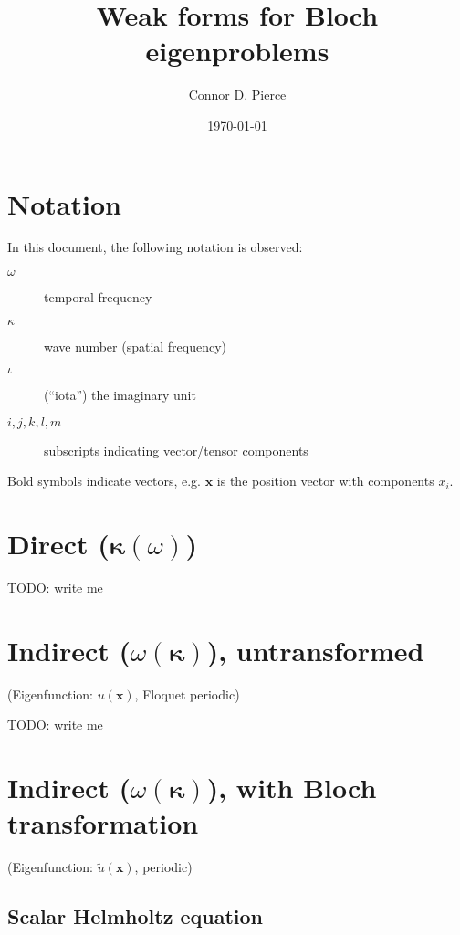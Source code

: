 \documentclass{article}
\title{Weak forms for Bloch eigenproblems}
\author{Connor D. Pierce}
\date{\today}
\newcommand{\imag}{\iota}
\newcommand{\vect}[1]{\boldsymbol{#1}}
\newcommand{\x}{x}
\newcommand{\vecx}{\vect{\x}}
\newcommand{\wavenum}{\kappa}
\newcommand{\wavevec}{\vect{\wavenum}}
\newcommand{\kernel}[1]{\tilde{#1}}
\begin{document}
\maketitle


\section{Notation}

In this document, the following notation is observed:

\begin{description}
    \item[$\omega$] temporal frequency
    \item[$\wavenum$] wave number (spatial frequency)
    \item[$\imag$] (``iota'') the imaginary unit
    \item[$i,j,k,l,m$] subscripts indicating vector/tensor components
\end{description}

Bold symbols indicate vectors, e.g. \(\vecx\) is the position vector with components \(\x_{i}\).


\section{Direct ($\wavevec(\omega)$)}
TODO: write me


\section{Indirect ($\omega(\wavevec)$), untransformed}
(Eigenfunction: $u(\vecx)$, Floquet periodic)

TODO: write me


\section{Indirect ($\omega(\wavevec)$), with Bloch transformation}
(Eigenfunction: $\kernel{u}(\vecx)$, periodic)


\subsection{Scalar Helmholtz equation}
\end{document}
